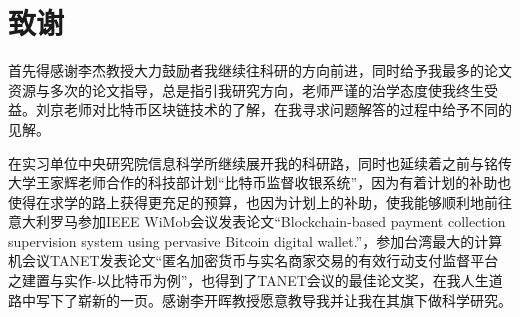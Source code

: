  
\chapter{致谢}
首先得感谢李杰教授大力鼓励者我继续往科研的方向前进，同时给予我最多的论文资源与多次的论文指导，总是指引我研究方向，老师严谨的治学态度使我终生受益。刘京老师对比特币区块链技术的了解，在我寻求问题解答的过程中给予不同的见解。

在实习单位中央研究院信息科学所继续展开我的科研路，同时也延续着之前与铭传大学王家辉老师合作的科技部计划“比特币监督收银系统”，因为有着计划的补助也使得在求学的路上获得更充足的预算，也因为计划上的补助，使我能够顺利地前往意大利罗马参加IEEE WiMob会议发表论文“Blockchain-based payment collection supervision system using pervasive Bitcoin digital wallet.”\supercite{Blockchain-basedpaymentcollectionsupervisionsystemusingpervasiveBitcoindigitalwallet}，参加台湾最大的计算机会议TANET发表论文“匿名加密货币与实名商家交易的有效行动支付监督平台之建置与实作-以比特币为例”，也得到了TANET会议的最佳论文奖，在我人生道路中写下了崭新的一页。感谢李开晖教授愿意教导我并让我在其旗下做科学研究。